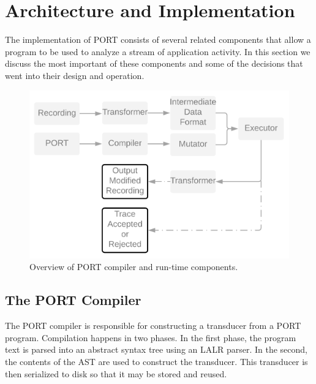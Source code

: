 \section{Architecture and Implementation}

The implementation of PORT consists of several related
components that allow a program to be used to analyze a stream of
application activity.
In this section we discuss the most important of these components and some
of the decisions that went into their design and operation.

\label{SEC:architecture}

\begin{figure}
  \includegraphics[scale=.19]{images/architecture}
  \caption{Overview of PORT compiler and run-time components.}
  \label{fig:architecture}
\end{figure}

\subsection{The PORT Compiler}

The PORT compiler is responsible for constructing a transducer
from a PORT program.
Compilation happens in two phases.  In the first phase, the program text is
parsed into an abstract syntax tree using an LALR parser.
In the second, the
contents of the AST are used to construct the transducer.
This transducer is then serialized to
disk so that it may be stored and reused.

